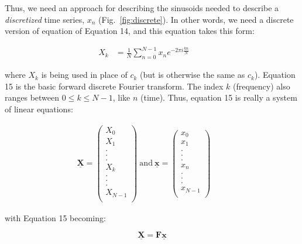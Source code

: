 \noindent Thus, we need an approach for describing the sinusoids needed to describe a \emph{discretized} time series, $x_n$ (Fig.~\ref{fig:discrete}). In other words, we need a discrete version of equation of Equation 14, and this equation takes this form:

\begin{align}
X_k &= \frac{1}{N} \sum_{n=0}^{N-1}x_n e^{-2\pi i \frac{kn}{N}} \qquad 
\end{align}

\noindent where $X_k$ is being used in place of $c_k$ (but is otherwise the same as $c_k$). Equation 15 is the basic forward discrete Fourier transform. The index $k$ (frequency) also ranges between $0\leq k \leq N-1$, like $n$ (time). Thus, equation 15 is really a system of linear equations:

\begin{align}
\mathbf{\underline{X}} = \begin{pmatrix} X_0 \\
			      X_1\\ 
			      .\\
			      .\\
			      .\\
			      X_k\\
			      .\\
			      .\\
			      .\\
			      X_{N-1}\\
       \end{pmatrix}
      ~\mathrm{and}~
      \mathbf{\underline{x}} = \begin{pmatrix} x_0 \\
			      x_1\\ 
			      .\\
			      .\\
			      .\\
			      x_n\\
			      .\\
			      .\\
			      .\\
			      x_{N-1}\\
       \end{pmatrix} \qquad 
\end{align}

\noindent with Equation 15 becoming:

\begin{equation*}
\mathbf{\underline{X}} = \mathbf{F}\mathbf{\underline{x}}
\end{equation*}

